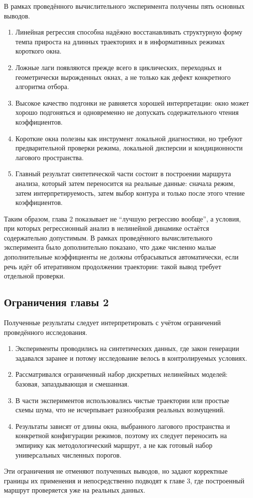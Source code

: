 В рамках проведённого вычислительного эксперимента получены пять основных выводов.

\begin{enumerate}
\def\labelenumi{\arabic{enumi}.}
\tightlist
\item
  Линейная регрессия способна надёжно восстанавливать структурную форму темпа прироста на длинных траекториях и в информативных режимах короткого окна.
\item
  Ложные лаги появляются прежде всего в циклических, переходных и геометрически вырожденных окнах, а не только как дефект конкретного алгоритма отбора.
\item
  Высокое качество подгонки не равняется хорошей интерпретации: окно может хорошо подгоняться и одновременно не допускать содержательного чтения коэффициентов.
\item
  Короткие окна полезны как инструмент локальной диагностики, но требуют предварительной проверки режима, локальной дисперсии и кондиционности лагового пространства.
\item
  Главный результат синтетической части состоит в построении маршрута анализа, который затем переносится на реальные данные: сначала режим, затем интерпретируемость, затем выбор контура и только после этого чтение коэффициентов.
\end{enumerate}

Таким образом, глава 2 показывает не ``лучшую регрессию вообще'', а условия, при которых регрессионный анализ в нелинейной динамике остаётся содержательно допустимым. В рамках проведённого вычислительного эксперимента было дополнительно показано, что даже численно малые дополнительные коэффициенты не должны отбрасываться автоматически, если речь идёт об итеративном продолжении траектории: такой вывод требует отдельной проверки.

\subsection{Ограничения главы 2}
\label{sec:ogranicheniya-glavy-2}

Полученные результаты следует интерпретировать с учётом ограничений проведённого исследования.

\begin{enumerate}
\def\labelenumi{\arabic{enumi}.}
\tightlist
\item
  Эксперименты проводились на синтетических данных, где закон генерации задавался заранее и потому исследование велось в контролируемых условиях.
\item
  Рассматривался ограниченный набор дискретных нелинейных моделей: базовая, запаздывающая и смешанная.
\item
  В части экспериментов использовались чистые траектории или простые схемы шума, что не исчерпывает разнообразия реальных возмущений.
\item
  Результаты зависят от длины окна, выбранного лагового пространства и конкретной конфигурации режимов, поэтому их следует переносить на эмпирику как методологический маршрут, а не как готовый набор универсальных численных порогов.
\end{enumerate}

Эти ограничения не отменяют полученных выводов, но задают корректные границы их применения и непосредственно подводят к главе 3, где построенный маршрут проверяется уже на реальных данных.
